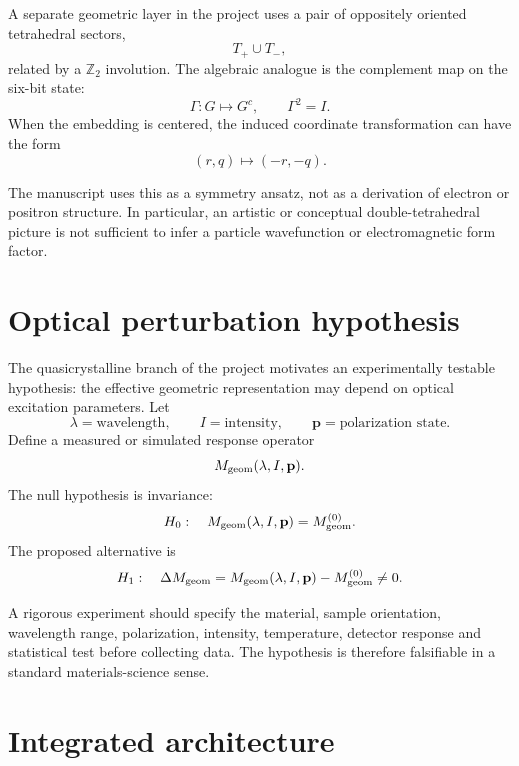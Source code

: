 \documentclass[11pt,a4paper]{article}
\numberwithin{equation}{section}
\begin{document}
A separate geometric layer in the project uses a pair of oppositely oriented tetrahedral sectors,
\[
T_+\cup T_-,
\]
related by a $\mathbb Z_2$ involution. The algebraic analogue is the complement map on the six-bit state:
\begin{equation}
\Gamma:G\mapsto G^c,
\qquad
\Gamma^2=I.
\end{equation}
When the embedding is centered, the induced coordinate transformation can have the form
\[
(r,q)\mapsto(-r,-q).
\]

The manuscript uses this as a symmetry ansatz, not as a derivation of electron or positron structure. In particular, an artistic or conceptual double-tetrahedral picture is not sufficient to infer a particle wavefunction or electromagnetic form factor.

\section{Optical perturbation hypothesis}
\label{sec:optical}

The quasicrystalline branch of the project motivates an experimentally testable hypothesis: the effective geometric representation may depend on optical excitation parameters. Let
\[
\lambda=\text{wavelength},\qquad I=\text{intensity},\qquad\mathbf p=\text{polarization state}.
\]
Define a measured or simulated response operator
\begin{equation}
M_{\rm geom}(\lambda,I,\mathbf p).
\end{equation}
The null hypothesis is invariance:
\begin{equation}
H_0:\quad
M_{\rm geom}(\lambda,I,\mathbf p)=M_{\rm geom}^{(0)}.
\end{equation}
The proposed alternative is
\begin{equation}
H_1:\quad
\Delta M_{\rm geom}
=M_{\rm geom}(\lambda,I,\mathbf p)-M_{\rm geom}^{(0)}\ne0.
\end{equation}

A rigorous experiment should specify the material, sample orientation, wavelength range, polarization, intensity, temperature, detector response and statistical test before collecting data. The hypothesis is therefore falsifiable in a standard materials-science sense.

\section{Integrated architecture}
\label{sec:integrated}
\end{document}
